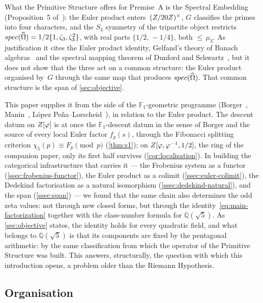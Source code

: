 What the Primitive Structure offers for Premise~A is the Spectral Embedding (Proposition~5
of~\cite{gonzalez25hp}): the Euler product enters~$(Z/20Z)^\times$, $G$ classifies the primes into four
characters, and the $S_3$ symmetry of the tripartite object restricts
$spec(\widehat{\Omega})=1/2\{1,\zeta_3,\zeta_3^2\}$, with real parts $\{1/2,\,-1/4\}$, both
${\le}\,\mu_3$.  As justification it cites the Euler product identity, Gelfand's theory of Banach
algebras~\cite{gelfand41} and the spectral mapping theorem of Dunford and
Schwartz~\cite{dunfordschwartz58}, but it does not show that the three act on a common structure: the
Euler product organised by~$G$ through the same map that produces $spec(\widehat{\Omega})$.  That common
structure is the span of \cref{sec:objective}.

This paper supplies it from the side of the $\mathbb{F}_1$-geometric programme (Borger~\cite{borger09},
Manin~\cite{manin95}, L\'opez Pe\~na--Lorscheid~\cite{lopezpena09mapping}), in relation to the Euler
product.  The descent datum on $Z[\varphi]$ is at once the $\mathbb{F}_1$-descent datum in the sense of Borger
and the source of every local Euler factor $f_p(s)$, through the Fibonacci splitting criterion
$\chi_5(p)\equiv F_p\pmod{p}$ (\cref{thm:s1}); on $Z[\varphi,\varphi^{-1},1/2]$, the ring of the companion paper, only its first half survives
(\cref{cor:localisation}).  In building the categorical infrastructure that carries it --- the
Frobenius system as a functor (\cref{ssec:frobenius-functor}), the Euler product as a colimit
(\cref{ssec:euler-colimit}), the Dedekind factorisation as a natural isomorphism
(\cref{ssec:dedekind-natural}), and the span (\cref{ssec:span}) --- we found that the same chain also
determines the odd zeta values: not through new closed forms, but through the
identity~\eqref{eq:main-factorization} together with the class-number formula for $\mathbb{Q}(\sqrt{5})$.
As \cref{sec:objective} states, the identity holds for every quadratic field, and what belongs to
$\mathbb{Q}(\sqrt{5})$ is that its components are fixed by the pentagonal arithmetic: by the same classification
from which the operator of the Primitive Structure was built.
This answers, structurally, the question with which this introduction opens, a problem older than the
Riemann Hypothesis.

\subsection{Organisation}\label{ssec:organisation}

